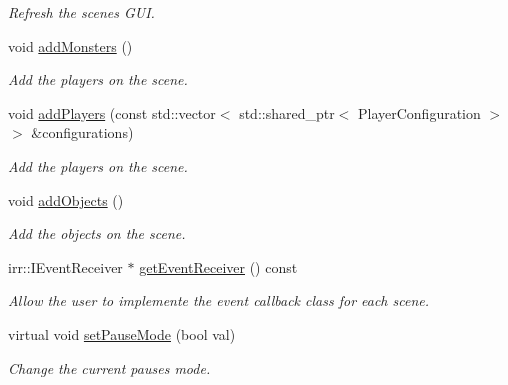 \begin{DoxyCompactItemize}
\begin{DoxyCompactList}\small\item\em Refresh the scene\textquotesingle{}s G\+UI. \end{DoxyCompactList}\item 
\mbox{\label{classGameSimulationScene_a4ca88431209fea3a0050e0e5b63b60eb}} 
void \hyperlink{classGameSimulationScene_a4ca88431209fea3a0050e0e5b63b60eb}{add\+Monsters} ()
\begin{DoxyCompactList}\small\item\em Add the players on the scene. \end{DoxyCompactList}\item 
\mbox{\label{classGameSimulationScene_a5712662af6ebc293ba8a58e5a717a921}} 
void \hyperlink{classGameSimulationScene_a5712662af6ebc293ba8a58e5a717a921}{add\+Players} (const std\+::vector$<$ std\+::shared\+\_\+ptr$<$ Player\+Configuration $>$ $>$ \&configurations)
\begin{DoxyCompactList}\small\item\em Add the players on the scene. \end{DoxyCompactList}\item 
\mbox{\label{classGameSimulationScene_a6bfca51ab0bb01f29c395aa3ab6448fc}} 
void \hyperlink{classGameSimulationScene_a6bfca51ab0bb01f29c395aa3ab6448fc}{add\+Objects} ()
\begin{DoxyCompactList}\small\item\em Add the objects on the scene. \end{DoxyCompactList}\item 
irr\+::\+I\+Event\+Receiver $\ast$ \hyperlink{classGameSimulationScene_a048b2a937caff3af7b4d54f8bd404ec1}{get\+Event\+Receiver} () const
\begin{DoxyCompactList}\small\item\em Allow the user to implemente the event callback class for each scene. \end{DoxyCompactList}\item 
virtual void \hyperlink{classGameSimulationScene_a34377bab69b7a81e50f3d2c42596c574}{set\+Pause\+Mode} (bool val)
\begin{DoxyCompactList}\small\item\em Change the current pause\textquotesingle{}s mode. \end{DoxyCompactList}\end{DoxyCompactItemize}


